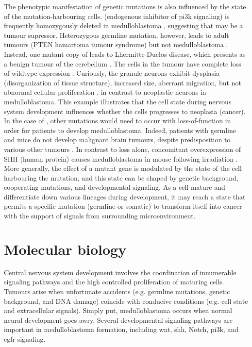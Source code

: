 The phenotypic manifestation of genetic mutations is also influenced by the state of the mutation-harbouring cells.  (endogenous inhibitor of \gls{pi3k} signaling) is frequently homozygously deleted in medulloblastoma , suggesting that  may be a tumour supressor. Heterozygous germline  mutation, however, leads to adult tumours (PTEN hamartoma tumour syndrome) but not medulloblastoma . Instead, one mutant copy of  leads to Lhermitte-Duclos disease, which presents as a benign tumour of the cerebellum . The cells in the tumour have complete loss of wildtype  expression . Curiously, the granule neurons exhibit dysplasia (disorganization of tissue structure), increased size, aberrant migration, but not abnormal cellular proliferation , in contrast to neoplastic neurons in medulloblastoma. This example illustrates that the cell state during nervous system development influences whether the cells progresses to neoplasia (cancer). In the case of , other mutations would need to occur with  loss-of-function in order for patients to develop medulloblastoma. Indeed, patients with germline  and \high{+/-} mice do not develop malignant brain tumours, despite predisposition to various other tumours . In contrast to  loss alone, concomitant overexpression of SHH (human protein) causes medulloblastoma in mouse following irradiation . More generally, the effect of a mutant gene is modulated by the state of the cell harbouring the mutation, and this state can be shaped by genetic background, cooperating mutations, and developmental signaling. As a cell mature and differentiate down various lineages during development, it may reach a state that permits a specific mutation (germline or somatic) to transform itself into cancer with the support of signals from surrounding microenvironment.


\section{Molecular biology}

Central nervous system development involves the coordination of innumerable signaling pathways and the high controlled proliferation of maturing cells. Tumours arise when unfortunate accidents (e.g. germline mutations, genetic background, and DNA damage) coincide with conducive conditions (e.g. cell state and extracellular signals). Simply put, medulloblastoma occurs when normal neural development goes awry. Several developmental signaling pathways are important in medulloblastoma formation, including \gls{wnt}, \gls{shh}, Notch, \gls{pi3k}, and \gls{egfr} signaling. 

